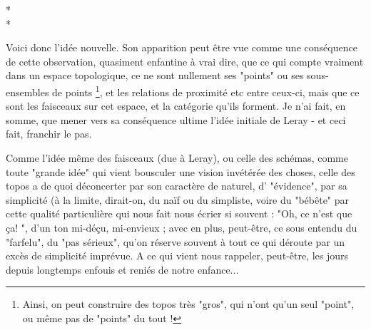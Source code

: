 \begin{center}
    * \quad * \\
    *
    \end{center}

Voici donc l'idée nouvelle. Son apparition peut être vue comme une conséquence de cette observation, quasiment enfantine à vrai dire, que ce qui compte vraiment dans un espace topologique, ce ne sont nullement ses "points" ou ses sous-ensembles de points \footnote{Ainsi, on peut construire des topos très "gros", qui n'ont qu'un seul "point", ou même pas de "points" du tout !}, et les relations de proximité etc entre ceux-ci, mais que ce sont les faisceaux sur cet espace, et la catégorie qu'ils forment. Je n'ai fait, en somme, que mener vers sa conséquence ultime l'idée initiale de Leray - et ceci fait, franchir le pas.

Comme l'idée même des faisceaux (due à Leray), ou celle des schémas, comme toute "grande idée" qui vient bousculer une vision invétérée des choses, celle des topos a de quoi déconcerter par son caractère de naturel, d' "évidence", par sa simplicité (à la limite, dirait-on, du naïf ou du simpliste, voire du "bébête" par cette qualité particulière qui nous fait nous écrier si souvent : "Oh, ce n'est que ça! ", d'un ton mi-déçu, mi-envieux ; avec en plus, peut-être, ce sous entendu du "farfelu", du "pas sérieux", qu'on réserve souvent à tout ce qui déroute par un excès de simplicité imprévue. A ce qui vient nous rappeler, peut-être, les jours depuis longtemps enfouis et reniés de notre enfance...

